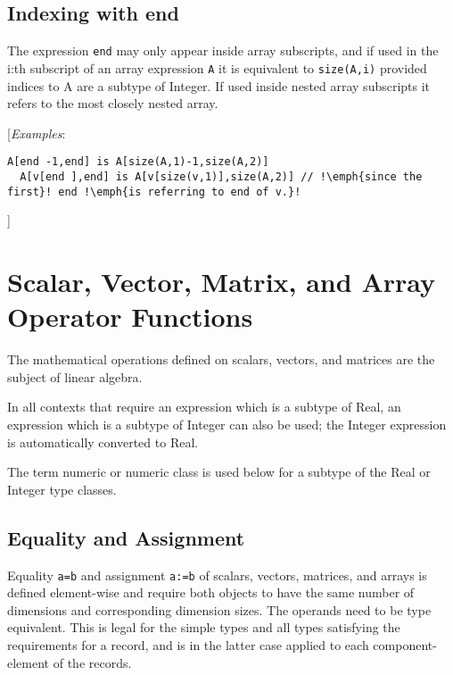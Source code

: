 \subsection{Indexing with end}

The expression \lstinline!end! may only appear inside array subscripts, and if used
in the i:th subscript of an array expression \lstinline!A! it is equivalent to
\lstinline!size(A,i)! provided indices to A are a subtype of Integer. If used inside
nested array subscripts it refers to the most closely nested array.

{[}\emph{Examples}:

\begin{lstlisting}[language=modelica, escapechar=!]
  A[end -1,end] is A[size(A,1)-1,size(A,2)]
  A[v[end ],end] is A[v[size(v,1)],size(A,2)] // !\emph{since the first}! end !\emph{is referring to end of v.}!
\end{lstlisting}
{]}

\section{Scalar, Vector, Matrix, and Array Operator Functions}

The mathematical operations defined on scalars, vectors, and matrices
are the subject of linear algebra.

In all contexts that require an expression which is a subtype of Real,
an expression which is a subtype of Integer can also be used; the
Integer expression is automatically converted to Real.

The term numeric or numeric class is used below for a subtype of the
Real or Integer type classes.

\subsection{Equality and Assignment}

Equality \lstinline!a=b! and assignment \lstinline!a:=b! of scalars, vectors, matrices, and
arrays is defined element-wise and require both objects to have the same
number of dimensions and corresponding dimension sizes. The operands
need to be type equivalent. This is legal for the simple types and all
types satisfying the requirements for a record, and is in the latter
case applied to each component-element of the records.

